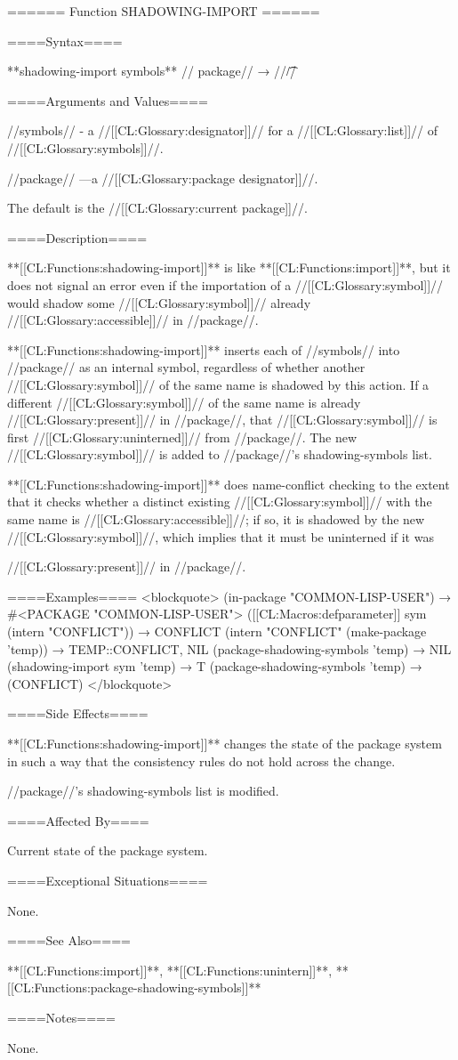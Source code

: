 ====== Function SHADOWING-IMPORT ======

====Syntax====

**shadowing-import {symbols** //\opt} package// → //\t//

====Arguments and Values====

//symbols// - a //[[CL:Glossary:designator]]// for a //[[CL:Glossary:list]]// of //[[CL:Glossary:symbols]]//.

//package// ---a //[[CL:Glossary:package designator]]//.

The default is the //[[CL:Glossary:current package]]//.

====Description====

**[[CL:Functions:shadowing-import]]** is like **[[CL:Functions:import]]**, but it does not signal an error even if the importation of a //[[CL:Glossary:symbol]]// would shadow some //[[CL:Glossary:symbol]]// already //[[CL:Glossary:accessible]]// in //package//.

**[[CL:Functions:shadowing-import]]** inserts each of //symbols// into //package// as an internal symbol, regardless of whether another //[[CL:Glossary:symbol]]// of the same name is shadowed by this action. If a different //[[CL:Glossary:symbol]]// of the same name is already //[[CL:Glossary:present]]// in //package//, that //[[CL:Glossary:symbol]]// is first //[[CL:Glossary:uninterned]]// from //package//. The new //[[CL:Glossary:symbol]]// is added to //package//'s shadowing-symbols list.

**[[CL:Functions:shadowing-import]]** does name-conflict checking to the extent that it checks whether a distinct existing //[[CL:Glossary:symbol]]// with the same name is //[[CL:Glossary:accessible]]//; if so, it is shadowed by the new //[[CL:Glossary:symbol]]//, which implies that it must be uninterned if it was

//[[CL:Glossary:present]]// in //package//.

====Examples==== <blockquote> (in-package "COMMON-LISP-USER") → #<PACKAGE "COMMON-LISP-USER"> ([[CL:Macros:defparameter]] sym (intern "CONFLICT")) → CONFLICT (intern "CONFLICT" (make-package 'temp)) → TEMP::CONFLICT, NIL (package-shadowing-symbols 'temp) → NIL (shadowing-import sym 'temp) → T (package-shadowing-symbols 'temp) → (CONFLICT) </blockquote>

====Side Effects====

**[[CL:Functions:shadowing-import]]** changes the state of the package system in such a way that the consistency rules do not hold across the change.

//package//'s shadowing-symbols list is modified.

====Affected By====

Current state of the package system.

====Exceptional Situations====

None.

====See Also====

**[[CL:Functions:import]]**, **[[CL:Functions:unintern]]**, **[[CL:Functions:package-shadowing-symbols]]**

====Notes====

None.

